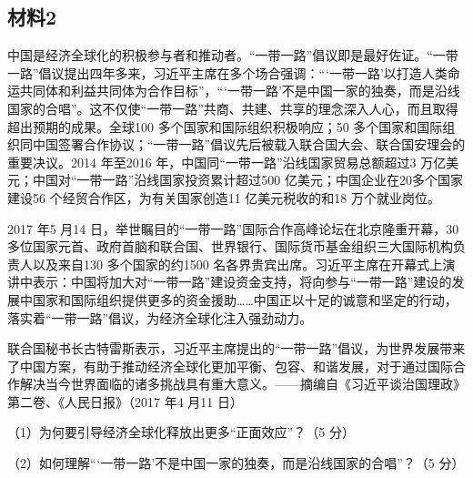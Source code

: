 \documentclass[UTF8,11pt]{ctexart}
\begin{document}
\subsection*{材料2}

中国是经济全球化的积极参与者和推动者。“一带一路”倡议即是最好佐证。“一带一路”倡议提出四年多来，习近平主席在多个场合强调：“‘一带一路’以打造人类命运共同体和利益共同体为合作目标”，“‘一带一路’不是中国一家的独奏，而是沿线国家的合唱”。这不仅使“一带一路”共商、共建、共享的理念深入人心，而且取得超出预期的成果。全球100 多个国家和国际组织积极响应；50 多个国家和国际组织同中国签署合作协议；“一带一路”倡议先后被载入联合国大会、联合国安理会的重要决议。2014 年至2016 年，中国同“一带一路”沿线国家贸易总额超过3 万亿美元；中国对“一带一路”沿线国家投资累计超过500 亿美元；中国企业在20多个国家建设56 个经贸合作区，为有关国家创造11 亿美元税收的和18 万个就业岗位。

2017 年5 月14 日，举世瞩目的“一带一路”国际合作高峰论坛在北京隆重开幕，30 多位国家元首、政府首脑和联合国、世界银行、国际货币基金组织三大国际机构负责人以及来自130 多个国家的约1500 名各界贵宾出席。习近平主席在开幕式上演讲中表示：中国将加大对“一带一路”建设资金支持，将向参与“一带一路”建设的发展中国家和国际组织提供更多的资金援助……中国正以十足的诚意和坚定的行动，落实着“一带一路”倡议，为经济全球化注入强劲动力。

联合国秘书长古特雷斯表示，习近平主席提出的“一带一路”倡议，为世界发展带来了中国方案，有助于推动经济全球化更加平衡、包容、和谐发展，对于通过国际合作解决当今世界面临的诸多挑战具有重大意义。——摘编自《习近平谈治国理政》第二卷、《人民日报》（2017 年4 月11 日）

（1）为何要引导经济全球化释放出更多“正面效应”？（5 分）


（2）如何理解“‘一带一路’不是中国一家的独奏，而是沿线国家的合唱”？（5 分）
\end{document}
